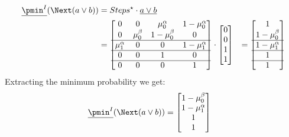 \begin{align*}
	\underline{\pmin^I}(\Next (a \vee b)) & = Steps^\star \cdot \underline{a \vee b}                             \\
	                                      & = \begin{bmatrix}
		                                          0            & 0           & \mu_0^\alpha  & 1-\mu_0^\alpha \\
		                                          0            & \mu_0^\beta & 1-\mu_0^\beta & 0              \\
		                                          \hline
		                                          \mu_1^\alpha & 0           & 0             & 1-\mu_1^\alpha \\
		                                          \hline
		                                          0            & 0           & 1             & 0              \\
		                                          \hline
		                                          0            & 0           & 0             & 1              \\
	                                          \end{bmatrix} \cdot \begin{bmatrix} 0 \\ 0 \\ 1 \\ 1 \end{bmatrix}
	                                      & = \begin{bmatrix}
		                                          1                \\
		                                          1 - \mu_0^\beta  \\
		                                          \hline
		                                          1 - \mu_1^\alpha \\
		                                          \hline
		                                          1                \\
		                                          \hline
		                                          1
	                                          \end{bmatrix}
\end{align*}
Extracting the minimum probability we get:
\begin{align*}
	\underline{\pmin^I}(\Next (a \vee b)) & = \begin{bmatrix}
		                                          1 - \mu_0^\beta  \\
		                                          1 - \mu_1^\alpha \\
		                                          1                \\
		                                          1
	                                          \end{bmatrix}
\end{align*}

